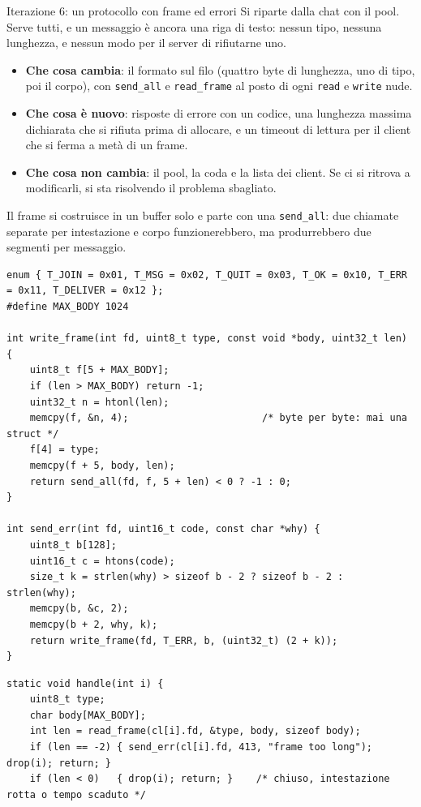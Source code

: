 \begin{esercizio}{Iterazione 6: un protocollo con frame ed errori}
Si riparte dalla chat con il pool. Serve tutti, e un messaggio è ancora una riga di testo: nessun tipo, nessuna lunghezza,
e nessun modo per il server di rifiutarne uno.
\begin{itemize}
    \item \textbf{Che cosa cambia}: il formato sul filo (quattro byte di lunghezza, uno di tipo, poi il corpo), con
          \texttt{send\_all} e \texttt{read\_frame} al posto di ogni \texttt{read} e \texttt{write} nude.
    \item \textbf{Che cosa è nuovo}: risposte di errore con un codice, una lunghezza massima dichiarata che si rifiuta prima
          di allocare, e un timeout di lettura per il client che si ferma a metà di un frame.
    \item \textbf{Che cosa non cambia}: il pool, la coda e la lista dei client. Se ci si ritrova a modificarli, si sta
          risolvendo il problema sbagliato.
\end{itemize}

\svolgimento
Il frame si costruisce in un buffer solo e parte con una \texttt{send\_all}: due chiamate separate per intestazione e
corpo funzionerebbero, ma produrrebbero due segmenti per messaggio.

\begin{lstlisting}[language={[POSIX]C}, style=wnumbers, title={chat\_proto.c: scrivere un frame}]
enum { T_JOIN = 0x01, T_MSG = 0x02, T_QUIT = 0x03, T_OK = 0x10, T_ERR = 0x11, T_DELIVER = 0x12 };
#define MAX_BODY 1024

int write_frame(int fd, uint8_t type, const void *body, uint32_t len) {
    uint8_t f[5 + MAX_BODY];
    if (len > MAX_BODY) return -1;
    uint32_t n = htonl(len);
    memcpy(f, &n, 4);                       /* byte per byte: mai una struct */
    f[4] = type;
    memcpy(f + 5, body, len);
    return send_all(fd, f, 5 + len) < 0 ? -1 : 0;
}

int send_err(int fd, uint16_t code, const char *why) {
    uint8_t b[128];
    uint16_t c = htons(code);
    size_t k = strlen(why) > sizeof b - 2 ? sizeof b - 2 : strlen(why);
    memcpy(b, &c, 2);
    memcpy(b + 2, why, k);
    return write_frame(fd, T_ERR, b, (uint32_t) (2 + k));
}
\end{lstlisting}

\begin{lstlisting}[language={[POSIX]C}, style=wnumbers, title={chatd.c: il worker legge un frame e risponde}]
static void handle(int i) {
    uint8_t type;
    char body[MAX_BODY];
    int len = read_frame(cl[i].fd, &type, body, sizeof body);
    if (len == -2) { send_err(cl[i].fd, 413, "frame too long"); drop(i); return; }
    if (len < 0)   { drop(i); return; }    /* chiuso, intestazione rotta o tempo scaduto */


\end{lstlisting}
\end{esercizio}
